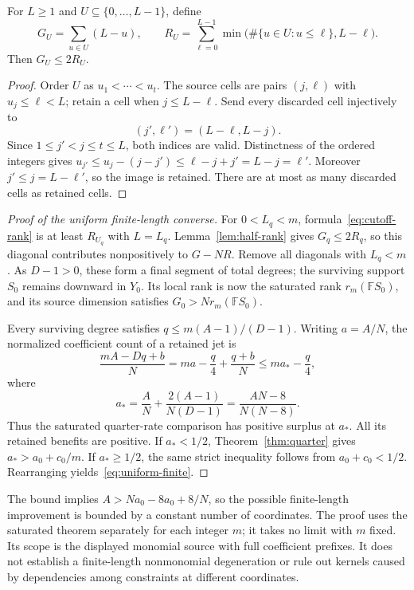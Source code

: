 \begin{lemma}\label{lem:half-rank}
For $L\ge1$ and $U\subseteq\{0,\ldots,L-1\}$, define
\[
 G_U=\sum_{u\in U}(L-u),\qquad
 R_U=\sum_{\ell=0}^{L-1}
 \min\bigl(\#\{u\in U:u\le\ell\},L-\ell\bigr).
\]
Then $G_U\le2R_U$.
\end{lemma}
\begin{proof}
Order $U$ as $u_1<\cdots<u_t$. The source cells are pairs $(j,\ell)$
with $u_j\le\ell<L$; retain a cell when $j\le L-\ell$. Send every
discarded cell injectively to
\[
 (j',\ell')=(L-\ell,L-j).
\]
Since $1\le j'<j\le t\le L$, both indices are valid. Distinctness of
the ordered integers gives
$u_{j'}\le u_j-(j-j')\le\ell-j+j'=L-j=\ell'$.
Moreover $j'\le j=L-\ell'$, so the image is retained. There are at
most as many discarded cells as retained cells.
\end{proof}

\begin{proof}[Proof of the uniform finite-length converse]
For $0<L_q<m$, formula~\eqref{eq:cutoff-rank} is at least $R_{U_q}$
with $L=L_q$. Lemma~\ref{lem:half-rank} gives $G_q\le2R_q$, so this
diagonal contributes nonpositively to $G-NR$. Remove all diagonals with
$L_q<m$. As $D-1>0$, these form a final segment of total degrees;
the surviving support $S_0$ remains downward in $Y_0$. Its local rank
is now the saturated rank $r_m(\mathbb F S_0)$, and its source dimension satisfies
$G_0>Nr_m(\mathbb F S_0)$.

Every surviving degree satisfies $q\le m(A-1)/(D-1)$. Writing $a=A/N$,
the normalized coefficient count of a retained jet is
\[
 \frac{mA-Dq+b}{N}
 =ma-\frac q4+\frac{q+b}{N}
 \le ma_* -\frac q4,
\]
where
\[
 a_* =\frac AN+\frac{2(A-1)}{N(D-1)}
     =\frac{AN-8}{N(N-8)}.
\]
Thus the saturated quarter-rate comparison has positive surplus at
$a_*$. All its retained benefits are positive. If $a_*<1/2$,
Theorem~\ref{thm:quarter} gives $a_*>a_0+c_0/m$. If $a_*\ge1/2$,
the same strict inequality follows from $a_0+c_0<1/2$. Rearranging
yields~\eqref{eq:uniform-finite}.
\end{proof}

The bound implies $A>Na_0-8a_0+8/N$, so the possible finite-length
improvement is bounded by a constant number of coordinates. The proof
uses the saturated theorem separately for each integer $m$; it takes
no limit with $m$ fixed. Its scope is the displayed monomial source
with full coefficient prefixes. It does not establish a finite-length
nonmonomial degeneration or rule out kernels caused by dependencies
among constraints at different coordinates.
